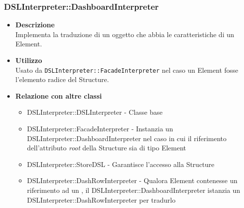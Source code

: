 \subsubsection{DSLInterpreter::DashboardInterpreter}
\begin{itemize}
\item \textbf{Descrizione} \hfill \\
Implementa la traduzione di un oggetto che abbia le caratteristiche di un  Element.
\item \textbf{Utilizzo} \hfill \\
Usato da \texttt{DSLInterpreter::FacadeInterpreter} nel caso un  Element fosse l'elemento radice del  Structure. 
\item \textbf{Relazione con altre classi}
\begin{itemize}
\item DSLInterpreter::DSLInterpreter - Classe base
\item DSLInterpreter::FacadeInterpreter - Instanzia un DSLInterpreter::DashboardInterpreter nel caso in cui il riferimento dell'attributo \textit{root} della  Structure sia di tipo  Element 
\item DSLInterpreter::StoreDSL - Garantisce l'accesso alla  Structure
\item DSLInterpreter::DashRowInterpreter - Qualora  Element contenesse un riferimento ad un , il DSLInterpreter::DashboardInterpreter istanzia un DSLInterpreter::DashRowInterpreter per tradurlo
\end{itemize}
\end{itemize}

